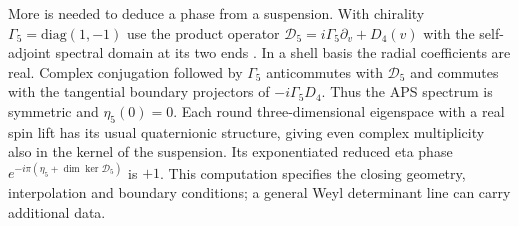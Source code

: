 More is needed to deduce a phase from a suspension. With chirality $\Gamma_5=\mathrm{diag}(1,-1)$ use the product operator $\mathcal D_5=i\Gamma_5\partial_v+D_4(v)$ with the self-adjoint spectral domain at its two ends \cite{DF,WY}. In a shell basis the radial coefficients are real. Complex conjugation followed by $\Gamma_5$ anticommutes with $\mathcal D_5$ and commutes with the tangential boundary projectors of $-i\Gamma_5D_4$. Thus the APS spectrum is symmetric and $\eta_5(0)=0$. Each round three-dimensional eigenspace with a real spin lift has its usual quaternionic structure, giving even complex multiplicity also in the kernel of the suspension. Its exponentiated reduced eta phase $e^{-i\pi(\eta_5+\dim\ker\mathcal D_5)}$ is $+1$. This computation specifies the closing geometry, interpolation and boundary conditions; a general Weyl determinant line can carry additional data.
